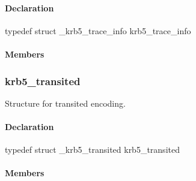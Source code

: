 \documentclass[letterpaper,10pt,english]{sphinxmanual}
\begin{document}
\paragraph{Declaration}
\label{appdev/refs/types/krb5_trace_info:declaration}
typedef struct \_krb5\_trace\_info  krb5\_trace\_info


\paragraph{Members}
\label{appdev/refs/types/krb5_trace_info:members}

\begin{fulllineitems}
\label{appdev/refs/types/krb5_trace_info:krb5_trace_info.message}
\end{fulllineitems}



\subsubsection{krb5\_transited}
\label{appdev/refs/types/krb5_transited:krb5-transited-struct}\label{appdev/refs/types/krb5_transited::doc}\label{appdev/refs/types/krb5_transited:krb5-transited}

\begin{fulllineitems}
\label{appdev/refs/types/krb5_transited:krb5_transited}
\end{fulllineitems}


Structure for transited encoding.


\paragraph{Declaration}
\label{appdev/refs/types/krb5_transited:declaration}
typedef struct \_krb5\_transited  krb5\_transited


\paragraph{Members}
\label{appdev/refs/types/krb5_transited:members}

\begin{fulllineitems}
\label{appdev/refs/types/krb5_transited:krb5_transited.magic}
\end{fulllineitems}
\end{document}
